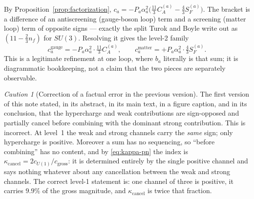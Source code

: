 \documentclass[11pt]{article}
\theoremstyle{definition}
\theoremstyle{remark}
\newtheorem{caution}[theorem]{Caution}
\newcommand{\gross}{c_{\mathrm{gross}}}
\newcommand{\kcancel}{\kappa_{\mathrm{cancel}}}
\begin{document}
By Proposition~\ref{prop:factorization}, $c_a = -P_a\alpha_a^2\big(\tfrac{11}{3}C_A^{(a)} -
\tfrac43 S_F^{(a)}\big)$. The bracket is a difference of an antiscreening (gauge-boson loop) term
and a screening (matter loop) term of opposite signs --- exactly the split Turok and Boyle write out
as $(11-\tfrac23 n_f)$ for $SU(3)$. Resolving it gives the level-2 family
\begin{equation}
c_a^{\mathrm{gauge}} = -P_a\alpha_a^2 \cdot \tfrac{11}{3}C_A^{(a)}, \qquad
c_a^{\mathrm{matter}} = +P_a\alpha_a^2 \cdot \tfrac43 S_F^{(a)}.
\label{eq:level2}
\end{equation}
This is a legitimate refinement at one loop, where $b_a$ literally is that sum; it is diagrammatic
bookkeeping, not a claim that the two pieces are separately observable.

\begin{caution}[Correction of a factual error in the previous version]
\label{caut:sign-correction}
The first version of this note stated, in its abstract, in its main text, in a figure caption, and
in its conclusion, that the hypercharge and weak contributions are sign-opposed and partially
cancel before combining with the dominant strong contribution. This is incorrect. At level~1 the
weak and strong channels carry the \emph{same} sign; only hypercharge is positive. Moreover a sum
has no sequencing, so ``before combining'' has no content, and by \eqref{eq:kappa-pn} the index is
$\kcancel = 2c_{U(1)}/\gross$: it is determined entirely by the single positive channel and says
nothing whatever about any cancellation between the weak and strong channels. The correct level-1
statement is: one channel of three is positive, it carries $9.9\%$ of the gross magnitude, and
$\kcancel$ is twice that fraction.
\end{caution}
\end{document}
